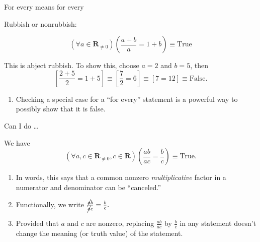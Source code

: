 \documentclass[portrait,fleqn,12pt]{beamer}
\newcommand{\reals}{\mathbf{R}}
\newenvironment{handlist}
   {\begin{enumerate}[\faHandPointRight]
       \addtolength{\itemsep}{0.0\itemsep}}
     {\end{enumerate}}
\begin{document}
\begin{frame}{For every means for every}

Rubbish or nonrubbish:

\begin{equation*}
  \left(\forall a \in \reals_{\neq 0} \right)\left(\frac{a+b}{a} = 1 + b \right) \equiv \text{True}
\end{equation*}

This is abject rubbish. To show this, choose $a=2$ and $b=5$, then
\begin{equation*}
    \left[ \frac{2+5}{2} = 1+5 \right] \equiv   \left[ \frac{7}{2} = 6 \right]  \equiv \left[ 7 = 12\right]  \equiv \text{False}.
\end{equation*}

\begin{handlist}
\item Checking a special case for a ``for every'' statement is a powerful way to possibly show that it is false.
\end{handlist}

\end{frame}

\begin{frame}{Can I do \dots}

\begin{theorem} We have 
\begin{equation*} 
   \left(\forall a, c\in \reals_{\neq 0}, c \in \reals \right)\left(\frac{a b}{a c} = \frac{b}{c} \right) \equiv \text{True}.
  \end{equation*}
\end{theorem}

\begin{handlist}
\item In words, this says that a common nonzero \emph{multiplicative} factor in a numerator and denominator can be ``canceled.''

\item Functionally, we write 
$
\frac{\cancel{a} b}{ \cancel{a} c}  = \frac{b}{c}.
$

\item Provided that $a$ and $c$ are  nonzero, replacing
$\frac{ab}{ac}$ by $\frac{b}{c}$ in any statement doesn't change the meaning (or truth value) of the statement.
\end{handlist}

\end{frame}
\end{document}
